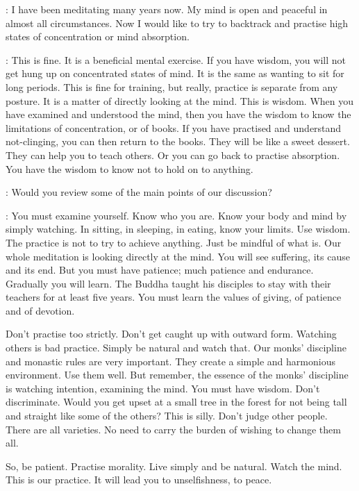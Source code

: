 :
I have been meditating many years now. My mind is open and peaceful in almost all circumstances. Now I would like to try to backtrack and practise high states of concentration or mind absorption.

: This is fine. It is a beneficial mental exercise. If you have wisdom, you will not get hung up on concentrated states of mind. It is the same as wanting to sit for long periods. This is fine for training, but really, practice is separate from any posture. It is a matter of directly looking at the mind. This is wisdom. When you have examined and understood the mind, then you have the wisdom to know the limitations of concentration, or of books. If you have practised and understand not-clinging, you can then return to the books. They will be like a sweet dessert. They can help you to teach others. Or you can go back to practise absorption. You have the wisdom to know not to hold on to anything.

:
Would you review some of the main points of our discussion?

: You must examine yourself. Know who you are. Know your body and mind by simply watching. In sitting, in sleeping, in eating, know your limits. Use wisdom. The practice is not to try to achieve anything. Just be mindful of what is. Our whole meditation is looking directly at the mind. You will see suffering, its cause and its end. But you must have patience; much patience and endurance. Gradually you will learn. The Buddha taught his disciples to stay with their teachers for at least five years. You must learn the values of giving, of patience and of devotion.

Don't practise too strictly. Don't get caught up with outward form. Watching others is bad practice. Simply be natural and watch that. Our monks' discipline and monastic rules are very important. They create a simple and harmonious environment. Use them well. But remember, the essence of the monks' discipline is watching intention, examining the mind. You must have wisdom. Don't discriminate. Would you get upset at a small tree in the forest for not being tall and straight like some of the others? This is silly. Don't judge other people. There are all varieties. No need to carry the burden of wishing to change them all.

So, be patient. Practise morality. Live simply and be natural. Watch the mind. This is our practice. It will lead you to unselfishness, to peace.
